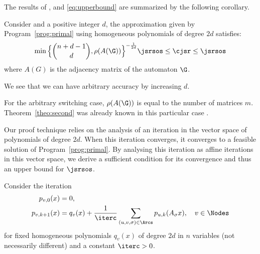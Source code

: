 The results of ,  and \eqref{eq:upperbound} are summarized by the following corollary.
\begin{corollary}
  \label{coro:mix}
  Consider  and a positive integer $d$,
  the approximation given by Program~\ref{prog:primal} using homogeneous polynomials of degree $2d$
  satisfies:
  \[
    \min\Big\{{n+d-1 \choose d}, \rho(A(\G))\Big\}^{-\frac{1}{2d}} \jsrsos%
    \leq \cjsr \leq \jsrsos
  \]
  where $A(G)$ is the adjacency matrix of the automaton $\G$.
\end{corollary}
We see that we can have arbitrary accuracy by increasing $d$.

For the arbitrary switching case, $\rho(A(\G))$ is equal to the number of matrices $m$.
Theorem~\ref{theo:second} was already known in this particular case \cite[Theorem~4.3]{parrilo2008approximation}.

Our proof technique relies on the analysis of an iteration in the vector space of polynomials of degree $2d$.
When this iteration converges, it converges to a feasible solution of Program~\ref{prog:primal}.
By analysing this iteration as affine iterations in this vector space, we derive a sufficient condition for its convergence
and thus an upper bound for $\jsrsos$.

Consider the iteration
\begin{align}
  \notag
  p_{v,0}(x) & = 0,\\
  \label{eq:iter}
  p_{v,k+1}(x) & = q_v(x) + \frac{1}{\iterc} %
  \sum_{(u,v,\sigma) \in \Arcs} p_{u,k}(A_\sigma x), \quad  v \in \Nodes
\end{align}
for fixed homogeneous polynomials $q_v(x)$ of degree $2d$ in $n$ variables (not necessarily different)
and a constant $\iterc > 0$.

